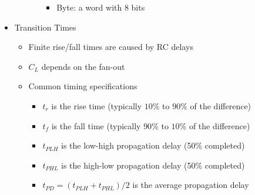 \begin{itemize}
\begin{itemize}
\begin{itemize}
\begin{itemize}
              \item Byte: a word with 8 bits

            \end{itemize}

        \end{itemize}

    \end{itemize}

  \item Transition Times

    \begin{itemize}

      \item Finite rise/fall times are caused by RC delays

      \item $C_L$ depends on the fan-out

      \item Common timing specifications

        \begin{itemize}

          \item $t_r$ is the rise time (typically $10\%$ to $90\%$ of the difference)

          \item $t_f$ is the fall time (typically $90\%$ to $10\%$ of the difference)

          \item $t_{PLH}$ is the low-high propagation delay (50\% completed)

          \item $t_{PHL}$ is the high-low propagation delay (50\% completed)

          \item $t_{PD}=(t_{PLH}+t_{PHL})/2$ is the average propagation delay

        \end{itemize}

    \end{itemize}

\end{itemize}



